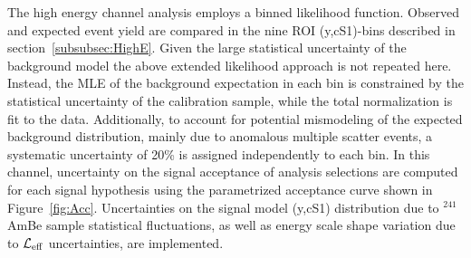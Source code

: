 The high energy channel analysis employs a binned likelihood function. Observed and expected event yield are compared in the nine ROI (y,cS1)-bins described in section~\ref{subsubsec:HighE}. 
Given the large statistical uncertainty of the background model the above extended likelihood approach is not repeated here.
Instead, the MLE of the background expectation in each bin is constrained by the statistical uncertainty of the calibration sample, while the total 
normalization is fit to the data. Additionally, to account for potential mismodeling of the expected background distribution, mainly due to anomalous multiple scatter events,
a systematic uncertainty of 20\% is assigned independently to each bin. In this channel, uncertainty on the signal acceptance of analysis selections are computed for each signal hypothesis using the parametrized acceptance curve shown in Figure~\ref{fig:Acc}.
Uncertainties on the signal model (y,cS1) distribution due to $^{241}$AmBe sample statistical fluctuations, as well as energy scale shape variation due to $\mathcal{L}_{\mathrm{eff}}$ uncertainties, are implemented.





